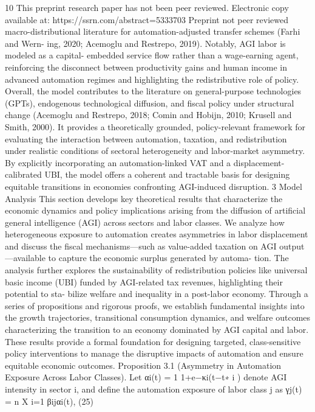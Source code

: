 10
This preprint research paper has not been peer reviewed. Electronic copy available at: https://ssrn.com/abstract=5333703
Preprint not peer reviewed
macro-distributional literature for automation-adjusted transfer schemes (Farhi and Wern-
ing, 2020; Acemoglu and Restrepo, 2019).
Notably, AGI labor is modeled as a capital-
embedded service flow rather than a wage-earning agent, reinforcing the disconnect between
productivity gains and human income in advanced automation regimes and highlighting the
redistributive role of policy.
Overall, the model contributes to the literature on general-purpose technologies (GPTs),
endogenous technological diffusion, and fiscal policy under structural change (Acemoglu
and Restrepo, 2018; Comin and Hobijn, 2010; Krusell and Smith, 2000).
It provides a
theoretically grounded, policy-relevant framework for evaluating the interaction between
automation, taxation, and redistribution under realistic conditions of sectoral heterogeneity
and labor-market asymmetry. By explicitly incorporating an automation-linked VAT and a
displacement-calibrated UBI, the model offers a coherent and tractable basis for designing
equitable transitions in economies confronting AGI-induced disruption.
3
Model Analysis
This section develops key theoretical results that characterize the economic dynamics and
policy implications arising from the diffusion of artificial general intelligence (AGI) across
sectors and labor classes. We analyze how heterogeneous exposure to automation creates
asymmetries in labor displacement and discuss the fiscal mechanisms—such as value-added
taxation on AGI output—available to capture the economic surplus generated by automa-
tion. The analysis further explores the sustainability of redistribution policies like universal
basic income (UBI) funded by AGI-related tax revenues, highlighting their potential to sta-
bilize welfare and inequality in a post-labor economy. Through a series of propositions and
rigorous proofs, we establish fundamental insights into the growth trajectories, transitional
consumption dynamics, and welfare outcomes characterizing the transition to an economy
dominated by AGI capital and labor. These results provide a formal foundation for designing
targeted, class-sensitive policy interventions to manage the disruptive impacts of automation
and ensure equitable economic outcomes.
Proposition 3.1 (Asymmetry in Automation Exposure Across Labor Classes). Let αi(t) =
1
1+e−κi(t−t∗
i ) denote AGI intensity in sector i, and define the automation exposure of labor
class j as
γj(t) =
n
X
i=1
βijαi(t),
(25)
